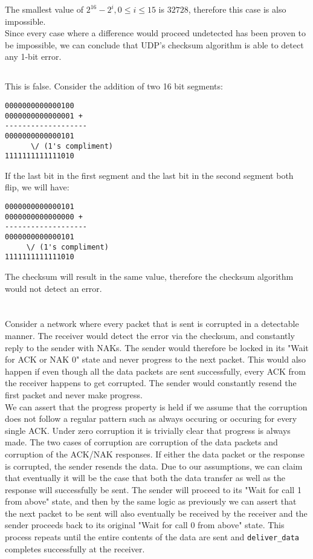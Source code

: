 \documentclass[12pt]{article}
\begin{document}
The smallest value of $2^{16} - 2^i, 0 \leq i \leq 15$ is $32728$, therefore
this case is also impossible.\\

Since every case where a difference would proceed undetected has been proven to
be impossible, we can conclude that UDP's checksum algorithm is able to detect
any 1-bit error.


\subsection{}
This is false.  Consider the addition of two 16 bit segments:

\begin{verbatim}
0000000000000100
0000000000000001 +
-------------------
0000000000000101
      \/ (1's compliment)
1111111111111010
\end{verbatim}

If the last bit in the first segment and the last bit in the second segment both
flip, we will have:

\begin{verbatim}
0000000000000101
0000000000000000 +
-------------------
0000000000000101
     \/ (1's compliment)
1111111111111010
\end{verbatim}

The checksum will result in the same value, therefore the checksum algorithm
would not detect an error.

\section{}

Consider a network where every packet that is sent is corrupted in a detectable
manner.  The receiver would detect the error via the checksum, and constantly
reply to the sender with NAKs.  The sender would therefore be locked in its
"Wait for ACK or NAK 0" state and never progress to the next packet.  This would
also happen if even though all the data packets are sent successfully, every ACK
from the receiver happens to get corrupted.  The sender would constantly resend
the first packet and never make progress.\\

We can assert that the progress property is held if we assume that the
corruption does not follow a regular pattern such as always occuring or occuring
for every single ACK. Under zero corruption it is trivially clear that progress
is always made.  The two cases of corruption are corruption of the data packets
and corruption of the ACK/NAK responses.  If either the data packet or the
response is corrupted, the sender resends the data.  Due to our assumptions, we
can claim that eventually it will be the case that both the data transfer as
well as the response will successfully be sent.  The sender will proceed to its
"Wait for call 1 from above" state, and then by the same logic as previously we
can assert that the next packet to be sent will also eventually be received by
the receiver and the sender proceeds back to its original "Wait for call 0 from
above" state.  This process repeats until the entire contents of the data are
sent and \texttt{deliver\_data} completes successfully at the receiver.
\end{document}
